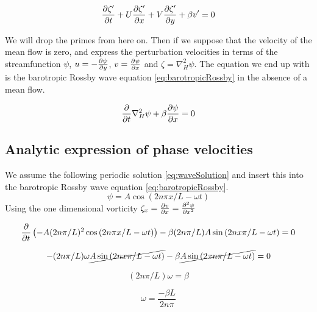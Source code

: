 \begin{equation}
    \pdv{\zeta '}{t} + U\pdv{\zeta'}{x} + V\pdv{\zeta'}{y} + \beta v' = 0
\end{equation}

We will drop the primes from here on. Then if we suppose that the velocity of
the mean flow is zero, and express the perturbation velocities in terms of the streamfunction
$\psi$, $u = -\pdv{\psi}{y}$, $v = \pdv{\psi}{x}$ and $\zeta = \nabla_H^2 \psi
$. The equation we end up with is the barotropic Rossby wave equation
\cref{eq:barotropicRossby} in the absence of a mean flow. 

\begin{equation}\label{eq:barotropicRossby}
    \pdv{}{t} \nabla_H^2 \psi + \beta \pdv{\psi}{x} = 0
\end{equation}

\subsection{Analytic expression of phase velocities}



We assume the following periodic solution \cref{eq:waveSolution} and
insert this into the barotropic Rossby wave equation \cref{eq:barotropicRossby}.
\begin{equation}\label{eq:waveSolution}
    \psi = A\cos{(2n\pi x /L - \omega t)}
\end{equation}
Using the one dimensional vorticity $\zeta_x = \pdv{v}{x} = \pdv[2]{\psi}{x}$

\begin{equation}
    \pdv{}{t} \left(-A (2n\pi/L)^2  \cos{(2n\pi x/L - \omega t)}\right) - \beta
     (2n\pi/L) A \sin{(2n x\pi/L - \omega t) = 0}
\end{equation}

\begin{equation}
    -(2n\pi/L)\omega \cancel{A\sin{(2n x\pi/L - \omega t)}} - \beta
    \cancel{A\sin{(2 xn\pi/L - \omega t)}} = 0
\end{equation}

\begin{equation}
    (2n\pi / L) \omega = \beta
\end{equation}

\begin{equation}\label{eq:omega1}
    \omega = \frac{-\beta L}{2n\pi}
\end{equation}

